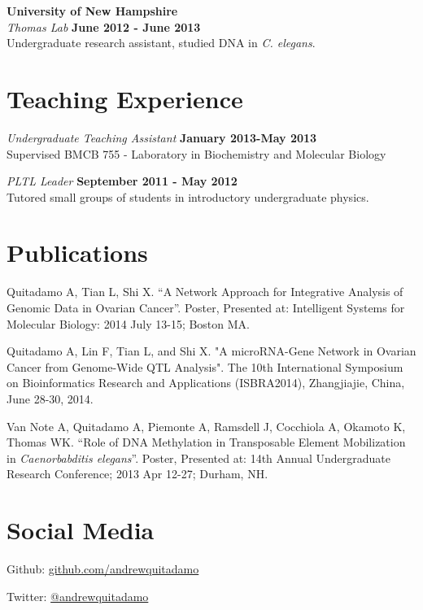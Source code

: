 \documentclass[margin,line]{res}
\begin{document}
\begin{resume}
{\bf University of New Hampshire}\\
{\em Thomas Lab} \hfill {\bf June 2012 - June 2013}\\
Undergraduate research assistant, studied DNA in {\em C. elegans}.\\ 


\section{\sc Teaching Experience}

{\em Undergraduate Teaching Assistant} \hfill {\bf January 2013-May 2013}\\
Supervised BMCB 755 - Laboratory in Biochemistry and Molecular Biology

{\em PLTL Leader} \hfill {\bf September 2011 - May 2012}\\
Tutored small groups of students in introductory undergraduate physics.

\section{\sc Publications}
Quitadamo A, Tian L, Shi X. “A Network Approach for Integrative Analysis of Genomic Data in Ovarian Cancer”. Poster, Presented at: Intelligent Systems for Molecular Biology: 2014 July 13-15; Boston MA.

Quitadamo A, Lin F, Tian L, and Shi X. "A microRNA-Gene Network in Ovarian Cancer from Genome-Wide QTL Analysis". The 10th International Symposium on Bioinformatics Research and Applications (ISBRA2014), Zhangjiajie, China, June 28-30, 2014.

Van Note A, Quitadamo A, Piemonte A, Ramsdell J, Cocchiola A, Okamoto K, Thomas WK. “Role of DNA Methylation in Transposable Element Mobilization in {\em Caenorbabditis elegans}”. Poster, Presented at: 14th Annual Undergraduate Research Conference; 2013 Apr 12-27; Durham, NH.

\section{\sc Social Media}

Github: \href{https://github.com/andrewquitadamo}{github.com/andrewquitadamo}

Twitter: \href{https://twitter.com/andrewquitadamo}{@andrewquitadamo}

\end{resume}
\end{document}
